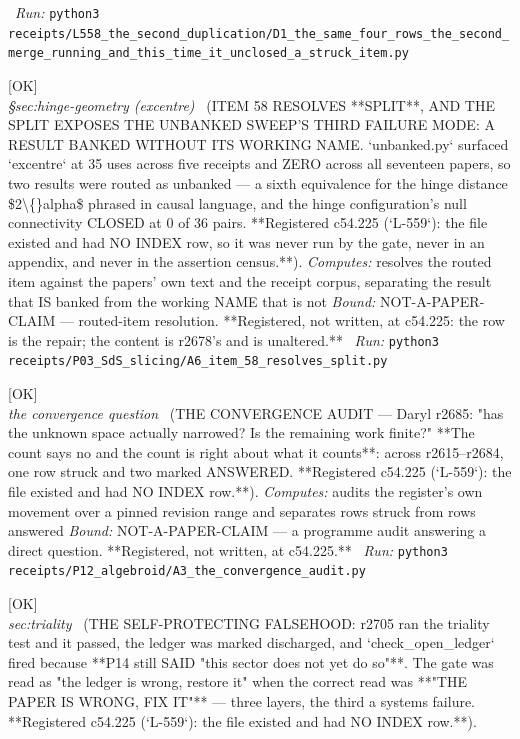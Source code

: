 \begin{description}
\ \emph{Run:} \texttt{python3 receipts/L558\_the\_second\_duplication/D1\_the\_same\_four\_rows\_the\_second\_merge\_running\_and\_this\_time\_it\_unclosed\_a\_struck\_item.py}
\item[\label{rcpt:A6_item_58_resolves_split}\texttt{A6\_item\_58\_resolves\_split}]\hfill\textsf{[OK]}\\
\textit{\S{}sec:hinge-geometry (excentre)} \ (ITEM 58 RESOLVES **SPLIT**, AND THE SPLIT EXPOSES THE UNBANKED SWEEP'S THIRD FAILURE MODE: A RESULT BANKED WITHOUT ITS WORKING NAME. `unbanked.py` surfaced `excentre` at 35 uses across five receipts and ZERO across all seventeen papers, so two results were routed as unbanked --- a sixth equivalence for the hinge distance \$2\textbackslash\{\}alpha\$ phrased in causal language, and the hinge configuration's null connectivity CLOSED at 0 of 36 pairs. **Registered c54.225 (`L-559`): the file existed and had NO INDEX row, so it was never run by the gate, never in an appendix, and never in the assertion census.**). 
\emph{Computes:} resolves the routed item against the papers' own text and the receipt corpus, separating the result that IS banked from the working NAME that is not
 \emph{Bound:} NOT-A-PAPER-CLAIM --- routed-item resolution. **Registered, not written, at c54.225: the row is the repair; the content is r2678's and is unaltered.**
\ \emph{Run:} \texttt{python3 receipts/P03\_SdS\_slicing/A6\_item\_58\_resolves\_split.py}
\item[\label{rcpt:A3_the_convergence_audit}\texttt{A3\_the\_convergence\_audit}]\hfill\textsf{[OK]}\\
\textit{the convergence question} \ (THE CONVERGENCE AUDIT --- Daryl r2685: "has the unknown space actually narrowed? Is the remaining work finite?" **The count says no and the count is right about what it counts**: across r2615--r2684, one row struck and two marked ANSWERED. **Registered c54.225 (`L-559`): the file existed and had NO INDEX row.**). 
\emph{Computes:} audits the register's own movement over a pinned revision range and separates rows struck from rows answered
 \emph{Bound:} NOT-A-PAPER-CLAIM --- a programme audit answering a direct question. **Registered, not written, at c54.225.**
\ \emph{Run:} \texttt{python3 receipts/P12\_algebroid/A3\_the\_convergence\_audit.py}
\item[\label{rcpt:A8_the_self_protecting_falsehood}\texttt{A8\_the\_self\_protecting\_falsehood}]\hfill\textsf{[OK]}\\
\textit{sec:triality} \ (THE SELF-PROTECTING FALSEHOOD: r2705 ran the triality test and it passed, the ledger was marked discharged, and `check\_open\_ledger` fired because **P14 still SAID "this sector does not yet do so"**. The gate was read as "the ledger is wrong, restore it" when the correct read was **"THE PAPER IS WRONG, FIX IT"** --- three layers, the third a systems failure. **Registered c54.225 (`L-559`): the file existed and had NO INDEX row.**). 

\end{description}
